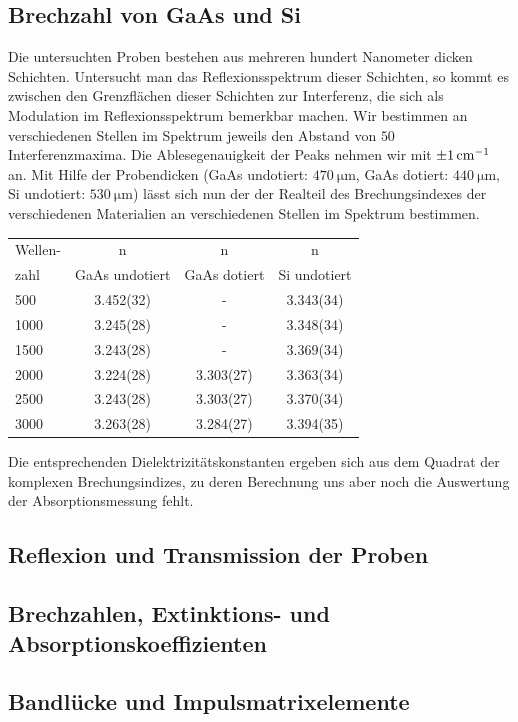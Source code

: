 \documentclass[paper=a4,fontsize=10pt,DIV=18,twocolumn,parskip=half]{scrartcl}
\numberwithin{equation}{section}    %
\begin{document}
\subsection{Brechzahl von GaAs und Si}
Die untersuchten Proben bestehen aus mehreren hundert Nanometer dicken 
Schichten.
Untersucht man das Reflexionsspektrum dieser Schichten, so kommt es zwischen den 
Grenzflächen dieser Schichten zur Interferenz, die sich als Modulation im 
Reflexionsspektrum bemerkbar machen.  Wir bestimmen an verschiedenen Stellen im 
Spektrum jeweils den Abstand von $50$ Interferenzmaxima. Die Ablesegenauigkeit 
der Peaks nehmen wir mit $\SI{\pm 1}{\centi\meter^{-1}}$ an.
Mit Hilfe der Probendicken (GaAs undotiert: $\SI{470}{\micro\meter}$, GaAs 
dotiert: $\SI{440}{\micro\meter}$, Si undotiert: $\SI{530}{\micro\meter}$) lässt 
sich nun der der Realteil des Brechungsindexes der verschiedenen Materialien an 
verschiedenen Stellen im Spektrum bestimmen.

\begin{tabular}{ l | c c c }
  Wellen- & n & n&n\\
  zahl & GaAs undotiert & GaAs dotiert & Si undotiert \\
  \hline
  500 & 3.452(32) & - & 3.343(34) \\
  1000 & 3.245(28) & - & 3.348(34) \\
  1500 & 3.243(28) & - & 3.369(34) \\
  2000 & 3.224(28) & 3.303(27) & 3.363(34) \\
  2500 & 3.243(28) & 3.303(27) & 3.370(34) \\
  3000 & 3.263(28) & 3.284(27) & 3.394(35) \\
\end{tabular}

Die entsprechenden Dielektrizitätskonstanten ergeben sich aus dem Quadrat der 
komplexen Brechungsindizes, zu deren Berechnung uns aber noch die Auswertung der 
Absorptionsmessung fehlt.

\subsection{Reflexion und Transmission der Proben}

\subsection{Brechzahlen, Extinktions- und Absorptionskoeffizienten}


\subsection{Bandlücke und Impulsmatrixelemente}
\end{document}
